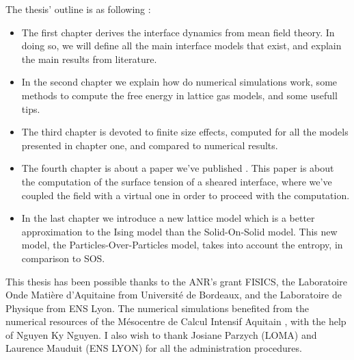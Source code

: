The thesis' outline is as following :
\begin{itemize}
    \item The first chapter derives the interface dynamics from mean field theory. In doing so, we will define all the main interface models that exist, and explain the main results from literature. 
    \item In the second chapter we explain how do numerical simulations work, some methods to compute the free energy in lattice gas models, and some usefull tips.
    \item The third chapter is devoted to finite size effects, computed for all the models presented in chapter one, and compared to numerical results. 
    \item The fourth chapter is about a paper we've published \cite{dean_effect_2020}. This paper is about the computation of the surface tension of a sheared interface, where we've coupled the field with a virtual one in order to proceed with the computation.
    \item In the last chapter we introduce a new lattice model which is a better approximation to the Ising model than the Solid-On-Solid model. This new model, the Particles-Over-Particles model, takes into account the entropy, in comparison to SOS.
\end{itemize}

This thesis has been possible thanks to the ANR's grant FISICS, the Laboratoire Onde Matière d'Aquitaine from Université de Bordeaux, and the Laboratoire de Physique  from ENS Lyon. The numerical simulations benefited from the numerical resources of the Mésocentre de Calcul Intensif Aquitain \cite{noauthor_mesocentre_nodate}, with the help of Nguyen Ky Nguyen. I also wish to thank Josiane Parzych (LOMA) and Laurence Mauduit (ENS LYON) for all the administration procedures.

